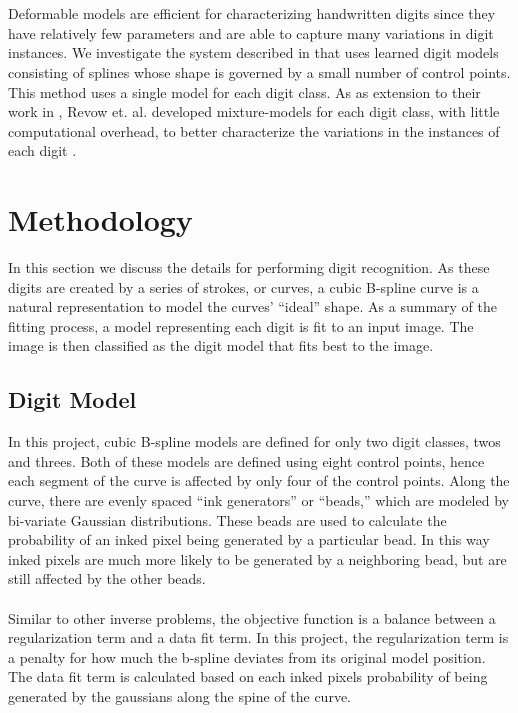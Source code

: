 \documentclass[oribibl]{llncs}
\begin{document}
\\
\\
Deformable models are efficient for characterizing handwritten digits since they have
relatively few parameters and are able to capture many variations in digit instances. We investigate the system described in \cite{Hinton92adaptiveelastic} that uses learned digit models consisting of splines whose shape is governed by a small number of control points. This method uses a single model for each digit class. As as extension to their work in \cite{Hinton92adaptiveelastic}, Revow et. al. developed mixture-models for each digit class, with little computational overhead, to better characterize the variations in the instances of each digit \cite{revow1993using}. 

\section{Methodology}
\label{sec:methodology}

In this section we discuss the details for performing digit recognition.
As these digits are created by a series of strokes, or curves, a cubic B-spline curve is a natural representation to model the curves' ``ideal'' shape. As a summary of the fitting process, a model representing each digit is fit to an input image. The image is then classified as the digit model that fits best to the image.

\subsection{Digit Model}
In this project, cubic B-spline models are defined for only two digit classes, twos and threes. Both of these models are defined using eight control points, hence each segment of the curve is affected by only four of the control points. Along the curve, there are evenly spaced ``ink generators'' or ``beads,'' which are modeled by bi-variate Gaussian distributions. These beads are used to calculate the probability of an inked pixel being generated by a particular bead. In this way inked pixels are much more likely to be generated by a neighboring bead, but are still affected by the other beads. 
\\
\\
Similar to other inverse problems, the objective function is a balance between a regularization term and a data fit term. In this project, the regularization term is a penalty for how much the b-spline deviates from its original model position. The data fit term is calculated based on each inked pixels probability of being generated by the gaussians along the spine of the curve. 
\end{document}

